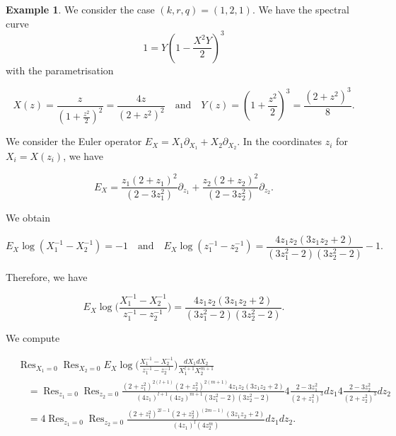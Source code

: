 \documentclass[10pt,a4paper,oneside,no-math,reqno]{amsart}%
\theoremstyle{plain}
\theoremstyle{definition}
\newtheorem{example}[theorem]{Example}
\theoremstyle{remark}
\numberwithin{equation}{section}
\newcommand{\1}{\mathds{1}}
\newcommand{\<}{\langle}
\renewcommand{\>}{\rangle}
\DeclareMathOperator*{\Res}{Res}
\begin{document}
\begin{example}
\label{ex-closedform}
We consider the case $(k,r,q)=(1,2,1)$. We have the spectral curve
\begin{equation}
    1
    =
    Y(1-\frac{X^2Y}{2})^3
\end{equation}
with the parametrisation

\begin{equation}
    X(z)
    =
    \frac{z}{(1+\frac{z^2}{2})^2}
    =
    \frac{4z}{(2+z^2)^2}
    \quad
    \textrm{and}
    \quad
    Y(z)
    =
    (1+\frac{z^2}{2})^3
    =
    \frac{(2+z^2)^3}{8}.
\end{equation}

We consider the Euler operator $ E_X = X_1 \partial_{X_1} + X_2 \partial_{X_2} $. In the coordinates $z_i$ for $X_i = X(z_i)$, we have

\begin{equation}
    E_X
    =
    \frac{z_1(2+z_1)^2}{(2-3z_1^2)} \partial_{z_1} + \frac{z_2(2+z_2)^2}{(2-3z_2^2)} \partial_{z_2}.
\end{equation}

We obtain

\begin{equation}
    E_X \log (X_1^{-1} - X_2^{-1})
    =
    -1
    \quad
    \textrm{and}
    \quad
    E_X \log (z_1^{-1} - z_2^{-1})
    =
    \frac{4z_1 z_2 (3z_1z_2 + 2)}{(3z_1^2 - 2) (3z_2^2 - 2)} - 1.
\end{equation}

Therefore, we have

\begin{equation}
    E_X \log \big( \frac{X_1^{-1} - X_2^{-1}}{z_1^{-1} - z_2^{-1}} \big)
    =
    \frac{4z_1 z_2 (3z_1 z_2 + 2)}{(3z_1^2 - 2) (3z_2^2 - 2)}.
\end{equation}

We compute

\begin{equation}
\begin{split}
    &\Res_{X_1=0} \Res_{X_2=0}  E_X  \log \big(\frac{X_1^{-1} - X_2^{-1}}{z_1^{-1} - z_2^{-1}} \big) \frac{dX_1 dX_2 }{X_1^{l+1} X_2^{m+1}}
    \\
    &\quad =
    \Res_{z_1=0} \Res_{z_2=0} \frac{(2 + z_1^2)^{2(l+1)} (2 + z_2^2)^{2(m+1)} 4 z_1 z_2 (3 z_1 z_2 + 2)}{(4z_1)^{l+1} (4z_2)^{m+1} (3z_1^2 - 2) (3z_2^2 - 2)}4 \frac{2 - 3z_1^2}{(2 + z_1^2)^3} dz_1 4 \frac{2 - 3z_2^2}{(2 + z_2^2)^3} dz_2
    \\
    &\quad =
    4 \Res_{z_1=0} \Res_{z_2=0} \frac{(2 + z_1^2)^{2l-1} (2 + z_2^2)^{(2m-1)}(3 z_1 z_2 + 2)}{(4 z_1)^l (4 z_2^m)} dz_1 dz_2.
\end{split}
\end{equation}


\end{example}
\end{document}
